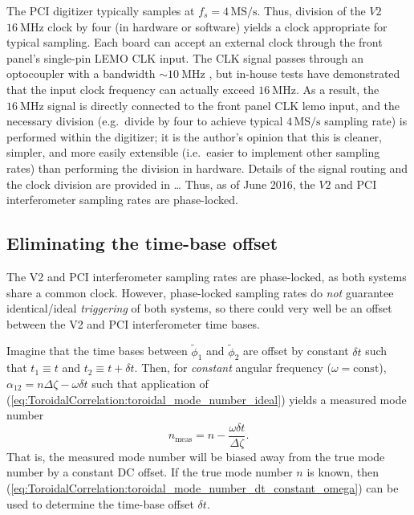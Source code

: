 The PCI digitizer typically samples at $f_s = 4 \, \text{MS/s}$.
Thus, division of the $V2$ $\SI{16}{\mega\hertz}$ clock by four
(in hardware or software) yields a clock appropriate for typical sampling.
Each board can accept an external clock
through the front panel's single-pin LEMO CLK input.
The CLK signal passes through an optocoupler
with a bandwidth $\sim \SI{10}{\mega\hertz}$
\cite{milne_optocoupler_pc16}, but
in-house tests have demonstrated
that the input clock frequency
can actually exceed $\SI{16}{\mega\hertz}$.
As a result, the $\SI{16}{\mega\hertz}$ signal
is directly connected to the front panel CLK lemo input, and
the necessary division
(e.g.\ divide by four to achieve typical $4 \, \text{MS/s}$ sampling rate)
is performed within the digitizer;
it is the author's opinion that
this is cleaner, simpler, and more easily extensible
(i.e.\ easier to implement other sampling rates)
than performing the division in hardware.
Details of the signal routing and the clock division
are provided in \ldots %
Thus, as of June 2016,
the $V2$ and PCI interferometer sampling rates
are phase-locked.


\subsection{Eliminating the time-base offset}
The V2 and PCI interferometer sampling rates are phase-locked,
as both systems share a common clock.
However, phase-locked sampling rates do \emph{not} guarantee
identical/ideal \emph{triggering} of both systems, so
there could very well be an offset between the
V2 and PCI interferometer time bases.

Imagine that the time bases between $\tilde{\phi}_1$ and $\tilde{\phi}_2$
are offset by constant $\delta t$ such that
$t_1 \equiv t$ and $t_2 \equiv t + \delta t$.
Then, for \emph{constant} angular frequency ($\omega = \text{const}$),
$\alpha_{12} = n \Delta \zeta - \omega \delta t$
such that application of
(\ref{eq:ToroidalCorrelation:toroidal_mode_number_ideal})
yields a measured mode number
\begin{equation}
  n_{\text{meas}} = n - \frac{\omega \delta t}{\Delta \zeta}.
  \label{eq:ToroidalCorrelation:toroidal_mode_number_dt_constant_omega}
\end{equation}
That is, the measured mode number will be biased away from
the true mode number by a constant DC offset.
If the true mode number $n$ is known,
then (\ref{eq:ToroidalCorrelation:toroidal_mode_number_dt_constant_omega})
can be used to determine the time-base offset $\delta t$.

